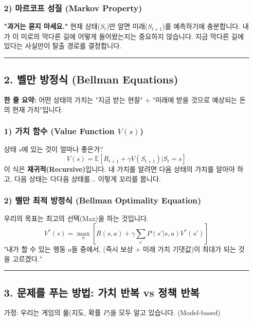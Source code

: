 \documentclass[11pt,a4paper]{book}
\theoremstyle{definition}
\begin{document}
\subsubsection*{2) 마르코프 성질 (Markov Property)}
\textbf{"과거는 묻지 마세요."}
현재 상태($S_t$)만 알면 미래($S_{t+1}$)를 예측하기에 충분합니다. 내가 이 미로의 막다른 길에 어떻게 들어왔는지는 중요하지 않습니다. 지금 막다른 길에 있다는 사실만이 탈출 경로를 결정합니다.

\vspace{0.5cm}\hrule\vspace{0.5cm}

\subsection{2. 벨만 방정식 (Bellman Equations)}

\begin{conceptbox}[title={개념 2: 가치(Value)의 재귀적 정의}]
\textbf{한 줄 요약:} 어떤 상태의 가치는 "지금 받는 현찰" + "미래에 받을 것으로 예상되는 돈의 현재 가치"입니다.
\end{conceptbox}

\subsubsection*{1) 가치 함수 (Value Function $V(s)$)}
상태 $s$에 있는 것이 얼마나 좋은가?
$$ V(s) = \mathbb{E} [ R_{t+1} + \gamma V(S_{t+1}) | S_t = s ] $$
이 식은 \textbf{재귀적(Recursive)}입니다. 내 가치를 알려면 다음 상태의 가치를 알아야 하고, 다음 상태는 다다음 상태를... 이렇게 꼬리를 뭅니다.

\subsubsection*{2) 벨만 최적 방정식 (Bellman Optimality Equation)}
우리의 목표는 최고의 선택(Max)을 하는 것입니다.
$$ V^*(s) = \max_a \left[ R(s,a) + \gamma \sum_{s'} P(s'|s,a) V^*(s') \right] $$
"내가 할 수 있는 행동 $a$들 중에서, (즉시 보상 + 미래 가치 기댓값)이 최대가 되는 것을 고르겠다."

\vspace{0.5cm}\hrule\vspace{0.5cm}

\subsection{3. 문제를 푸는 방법: 가치 반복 vs 정책 반복}


가정: 우리는 게임의 룰(지도, 확률 $P$)을 모두 알고 있습니다. (Model-based)
\end{document}
